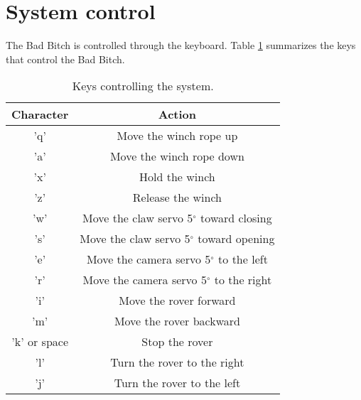 \documentclass[letterpaper, 12 pt]{article}
\begin{document}
\section{System control}
The Bad Bitch is controlled through the keyboard. Table \ref{tab:keys} summarizes the keys that control the Bad Bitch.
\begin{table}[h]
\begin{center}
\caption{Keys controlling the system.}
\label{tab:keys}
\vspace{0.5cm}
\begin{tabular}{|c|c|}
\hline
\textbf{Character} & \textbf{Action}\\
\hline
'q' & Move the winch rope up\\
\hline
'a' & Move the winch rope down\\
\hline
'x' & Hold the winch\\
\hline
'z' & Release the winch\\
\hline 
'w' & Move the claw servo 5$^{\circ}$ toward closing\\
\hline  
's' & Move the claw servo 5$^{\circ}$ toward opening\\
\hline
'e' & Move the camera servo 5$^{\circ}$ to the left\\
\hline  
'r' & Move the camera servo 5$^{\circ}$ to the right\\
\hline
'i' & Move the rover forward\\
\hline
'm' & Move the rover backward\\
\hline
'k' or space & Stop the rover\\
\hline
'l' & Turn the rover to the right\\
\hline
'j' & Turn the rover to the left\\
\hline

\end{tabular}
\end{center}
\end{table}
%

\end{document}
